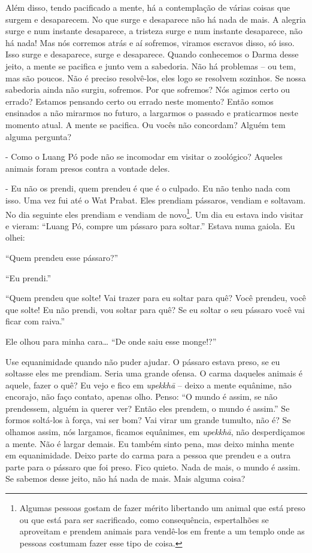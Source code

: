 Além disso, tendo pacificado a mente, há a contemplação de várias
coisas que surgem e desaparecem. No que surge e desaparece não há nada
de mais. A alegria surge e num instante desaparece, a tristeza surge e
num instante desaparece, não há nada! Mas nós corremos atrás e aí
sofremos, viramos escravos disso, só isso. Isso surge e desaparece,
surge e desaparece. Quando conhecemos o Darma desse jeito, a mente se
pacifica e junto vem a sabedoria. Não há problemas – ou tem, mas são
poucos. Não é preciso resolvê-los, eles logo se resolvem sozinhos. Se
nossa sabedoria ainda não surgiu, sofremos. Por que sofremos? Nós
agimos certo ou errado? Estamos pensando certo ou errado neste momento?
Então somos ensinados a não mirarmos no futuro, a largarmos o passado e
praticarmos neste momento atual. A mente se pacifica. Ou vocês não
concordam? Alguém tem alguma pergunta?

{}- Como o Luang Pó pode não se incomodar em visitar o zoológico?
Aqueles animais foram presos contra a vontade deles.

{}- Eu não os prendi, quem prendeu é que é o culpado. Eu não tenho
nada com isso. Uma vez fui até o Wat Prabat. Eles prendiam pássaros,
vendiam e soltavam. No dia seguinte eles prendiam e vendiam de
novo\footnote{Algumas pessoas gostam de fazer mérito libertando um
animal que está preso ou que está para ser sacrificado, como
consequência, espertalhões se aproveitam e prendem animais para
vendê-los em frente a um templo onde as pessoas costumam fazer esse
tipo de coisa.}. Um dia eu estava indo visitar e vieram: “Luang Pó,
compre um pássaro para soltar.” Estava numa gaiola. Eu olhei:

“Quem prendeu esse pássaro?”

“Eu prendi.”

“Quem prendeu que solte! Vai trazer para eu soltar para quê? Você
prendeu, você que solte! Eu não prendi, vou soltar para quê? Se eu
soltar o seu pássaro você vai ficar com raiva.”

Ele olhou para minha cara… “De onde saiu esse monge!?” 

Use equanimidade quando não puder ajudar. O pássaro estava preso, se
eu soltasse eles me prendiam. Seria uma grande ofensa. O carma daqueles
animais é aquele, fazer o quê? Eu vejo e fico em \textit{upekkh\=a }–
deixo a mente equânime, não encorajo, não faço contato, apenas olho.
Penso: “O mundo é assim, se não prendessem, alguém ia querer ver? Então
eles prendem, o mundo é assim.” Se formos soltá-los à força, vai ser
bom? Vai virar um grande tumulto, não é? Se olhamos assim, nós
largamos, ficamos equânimes, em \textit{upekkh\=a}, não desperdiçamos a
mente. Não é largar demais. Eu também sinto pena, mas deixo minha mente
em equanimidade. Deixo parte do carma para a pessoa que prendeu e a
outra parte para o pássaro que foi preso. Fico quieto. Nada de mais, o
mundo é assim. Se sabemos desse jeito, não há nada de mais. Mais alguma
coisa?

